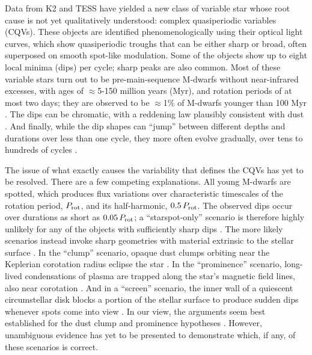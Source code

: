\documentclass[11pt,twocolumn,tighten]{aastex63}
\begin{document}
Data from K2 and TESS have yielded a new class of variable star whose
root cause is not yet qualitatively understood: complex quasiperiodic
variables (CQVs).  These objects are identified phenomenologically
using their optical light curves, which show quasiperiodic troughs
that can be either sharp or broad, often superposed on smooth
spot-like modulation.  Some of the objects show up to eight local
minima (dips) per cycle; sharp peaks are also common.  Most of these
variable stars turn out to be pre-main-sequence M-dwarfs without
near-infrared excesses, with ages of $\approx$5-150 million years
(Myr), and rotation periods of at most two days; they are observed to
be $\approx$1\% of M-dwarfs younger than 100 Myr
\citep{2017AJ....153..152S,2018AJ....155...63S,2019ApJ...876..127Z,2022AJ....163..144G}.
The dips can be chromatic, with a reddening law plausibly consistent
with dust
\citep{2020AJ....160...86B,2022AJ....163..144G,2023MNRAS.518.2921K}.
And finally, while the dip shapes can ``jump'' between different
depths and durations over less than one cycle, they more often evolve
gradually, over tens to hundreds of cycles
\citep[e.g.][]{2017AJ....153..152S,2023ApJ...945..114P}.

The issue of what exactly causes the variability that defines the CQVs
has yet to be resolved.  There are a few competing explanations.  All
young M-dwarfs are spotted, which produces flux variations over
characteristic timescales of the rotation period, $P_{\rm rot}$, and
its half-harmonic, $0.5\,P_{\rm rot}$.  The observed dips occur over
durations as short as $0.05\,P_{\rm rot}$; a ``starspot-only''
scenario is therefore highly unlikely for any of the objects with
sufficiently sharp dips
\citep{2017AJ....153..152S,2021MNRAS.500.1366K}.   The more likely
scenarios instead invoke sharp geometries with material extrinsic to
the stellar surface \citep[see
Refs.~][]{2017AJ....153..152S,2022AJ....163..144G}.  In the ``clump''
scenario, opaque dust clumps orbiting near the Keplerian corotation
radius eclipse the star
\citep{2017AJ....153..152S,2023MNRAS.518.4734S}.  In the
``prominence'' scenario, long-lived condensations of plasma are
trapped along the star’s magnetic field lines, also near corotation
\citep{2022MNRAS.514.5465W}.  And in a ``screen'' scenario, the inner
wall of a quiescent circumstellar disk blocks a portion of the stellar
surface to produce sudden dips whenever spots come into view
\citep{2019ApJ...876..127Z}.  In our view, the arguments seem best
established for the dust clump and prominence hypotheses
\citep{2023MNRAS.518.4734S,2022MNRAS.514.5465W}.  However, unambiguous
evidence has yet to be presented to demonstrate which, if any, of
these scenarios is correct.
\end{document}
